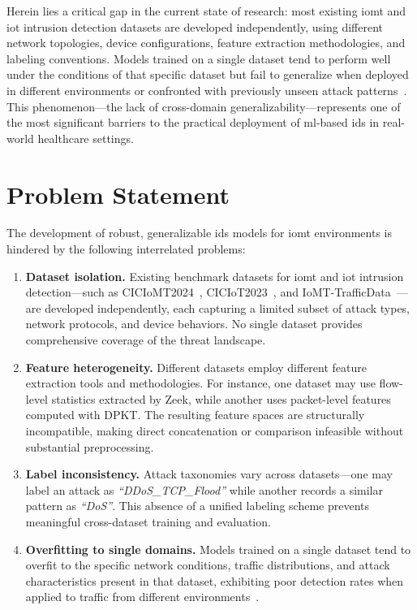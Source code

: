 Herein lies a critical gap in the current state of research: most existing \gls{iomt} and \gls{iot} intrusion detection datasets are developed independently, using different network topologies, device configurations, feature extraction methodologies, and labeling conventions. Models trained on a single dataset tend to perform well under the conditions of that specific dataset but fail to generalize when deployed in different environments or confronted with previously unseen attack patterns~\cite{domenech2025evaluating}. This phenomenon---the lack of cross-domain generalizability---represents one of the most significant barriers to the practical deployment of \gls{ml}-based \gls{ids} in real-world healthcare settings.

\section{Problem Statement}
\label{sec:problem}

The development of robust, generalizable \gls{ids} models for \gls{iomt} environments is hindered by the following interrelated problems:

\begin{enumerate}[leftmargin=*, label=\textbf{P\arabic*.}]
    \item \textbf{Dataset isolation.} Existing benchmark datasets for \gls{iomt} and \gls{iot} intrusion detection---such as CICIoMT2024~\cite{dadkhah2024ciciomt}, CICIoT2023~\cite{neto2023ciciot2023}, and IoMT-TrafficData~\cite{areia2024iomt}---are developed independently, each capturing a limited subset of attack types, network protocols, and device behaviors. No single dataset provides comprehensive coverage of the threat landscape.

    \item \textbf{Feature heterogeneity.} Different datasets employ different feature extraction tools and methodologies. For instance, one dataset may use flow-level statistics extracted by Zeek, while another uses packet-level features computed with DPKT. The resulting feature spaces are structurally incompatible, making direct concatenation or comparison infeasible without substantial preprocessing.

    \item \textbf{Label inconsistency.} Attack taxonomies vary across datasets---one may label an attack as \textit{``DDoS\_TCP\_Flood''} while another records a similar pattern as \textit{``DoS''}. This absence of a unified labeling scheme prevents meaningful cross-dataset training and evaluation.

    \item \textbf{Overfitting to single domains.} Models trained on a single dataset tend to overfit to the specific network conditions, traffic distributions, and attack characteristics present in that dataset, exhibiting poor detection rates when applied to traffic from different environments~\cite{domenech2025evaluating}.
\end{enumerate}

